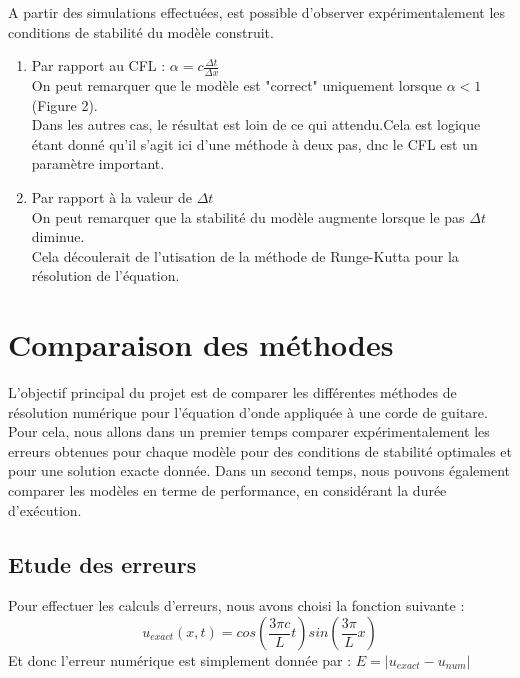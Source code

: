 A partir des simulations effectuées, est possible d'observer expérimentalement les conditions de stabilité du modèle construit.
\begin{enumerate}
    \item Par rapport au CFL : $\alpha = c\frac{\Delta t}{\Delta x}$\\
    On peut remarquer que le modèle est "correct" uniquement lorsque $\alpha < 1$ (Figure 2).\\
    Dans les autres cas, le résultat est loin de ce qui attendu.Cela est logique étant donné qu'il s'agit ici d'une méthode à deux pas, dnc le CFL est un paramètre important.
    \item Par rapport à la valeur de $\Delta t$\\
    On peut remarquer que la stabilité du modèle augmente lorsque le pas $\Delta t$ diminue.\\
    Cela découlerait de l'utisation de la méthode de Runge-Kutta pour la résolution de l'équation.
    
\end{enumerate}


\section{Comparaison des méthodes}
L'objectif principal du projet est de comparer les différentes méthodes de résolution numérique pour l'équation d'onde appliquée à une corde de guitare.
Pour cela, nous allons dans un premier temps comparer expérimentalement les erreurs obtenues pour chaque modèle pour des conditions de stabilité optimales et pour une solution exacte donnée.
Dans un second temps, nous pouvons également comparer les modèles en terme de performance, en considérant la durée d'exécution.

\subsection{Etude des erreurs}
\newline
Pour effectuer les calculs d'erreurs, nous avons choisi la fonction suivante :
\begin{equation*}
    u_{exact}(x,t)=cos(\frac{3 \pi c}{L}t)sin(\frac{3 \pi }{L}x )
\end{equation*}
Et donc l'erreur numérique est simplement donnée par :
     $E=|u_{exact} - u_{num}|$

